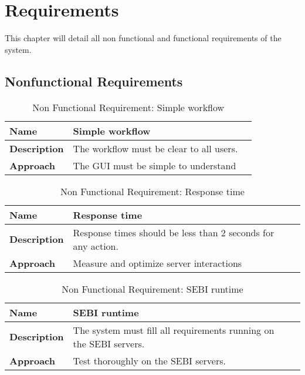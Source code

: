 \chapter{Requirements}
This chapter will detail all non functional and functional requirements of the system.

\section{Nonfunctional Requirements}

\begin{table}[h!]
	\centering
	\caption{Non Functional Requirement: Simple workflow}
	\label{nfr_workflow}
	\begin{tabularx}{\textwidth}{l l l}
		\hline
		\textbf{Name} & Simple workflow \\ \hline
		
		\textbf{Description} & The workflow must be clear to all users. \\ \hline
		
		\textbf{Approach} & The GUI must be simple to understand \\ \hline
		
	\end{tabularx}
\end{table}

\begin{table}[h!]
	\centering
	\caption{Non Functional Requirement: Response time}
	\label{nfr_response}
	\begin{tabularx}{\textwidth}{l l l}
		\hline
		\textbf{Name} & Response time \\ \hline
		
		\textbf{Description} & Response times should be less than 2 seconds for any action. \\ \hline
		
		\textbf{Approach} & Measure and optimize server interactions \\ \hline
		
	\end{tabularx}
\end{table}

\begin{table}[h!]
	\centering
	\caption{Non Functional Requirement: SEBI runtime}
	\label{nfr_sebi}
	\begin{tabularx}{\textwidth}{l l l}
		\hline
		\textbf{Name} & SEBI runtime \\ \hline
		
		\textbf{Description} & The system must fill all requirements running on the SEBI servers. \\ \hline
		
		\textbf{Approach} & Test thoroughly on the SEBI servers.  \\ \hline
		
	\end{tabularx}
\end{table}


